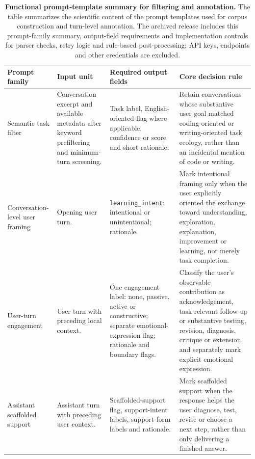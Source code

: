 \begin{table}[!htbp]
\centering
\scriptsize
\caption{\textbf{Functional prompt-template summary for filtering and annotation.} The table summarizes the scientific content of the prompt templates used for corpus construction and turn-level annotation. The archived release includes this prompt-family summary, output-field requirements and implementation controls for parser checks, retry logic and rule-based post-processing; API keys, endpoints and other credentials are excluded.}
\label{tab:prompt_template_summary}
\setlength{\tabcolsep}{4.5pt}
\renewcommand{\arraystretch}{1.16}
\begin{tabularx}{\textwidth}{>{\raggedright\arraybackslash}p{}>{\raggedright\arraybackslash}p{}>{\raggedright\arraybackslash}p{}>{\raggedright\arraybackslash}X}
\toprule
Prompt family & Input unit & Required output fields & Core decision rule \\
\midrule
Semantic task filter & Conversation excerpt and available metadata after keyword prefiltering and minimum-turn screening. & Task label, English-oriented flag where applicable, confidence or score and short rationale. & Retain conversations whose substantive user goal matched coding-oriented or writing-oriented task ecology, rather than an incidental mention of code or writing. \\
\addlinespace
Conversation-level user framing & Opening user turn. & \texttt{learning\_intent}: intentional or unintentional; rationale. & Mark intentional framing only when the user explicitly oriented the exchange toward understanding, exploration, explanation, improvement or learning, not merely task completion. \\
\addlinespace
User-turn engagement & User turn with preceding local context. & One engagement label: none, passive, active or constructive; separate emotional-expression flag; rationale and boundary flags. & Classify the user's observable contribution as acknowledgement, task-relevant follow-up or substantive testing, revision, diagnosis, critique or extension, and separately mark explicit emotional expression. \\
\addlinespace
Assistant scaffolded support & Assistant turn with preceding user context. & Scaffolded-support flag, support-intent labels, support-form labels and rationale. & Mark scaffolded support when the response helps the user diagnose, test, revise or choose a next step, rather than only delivering a finished answer. \\

\end{tabularx}
\end{table}
